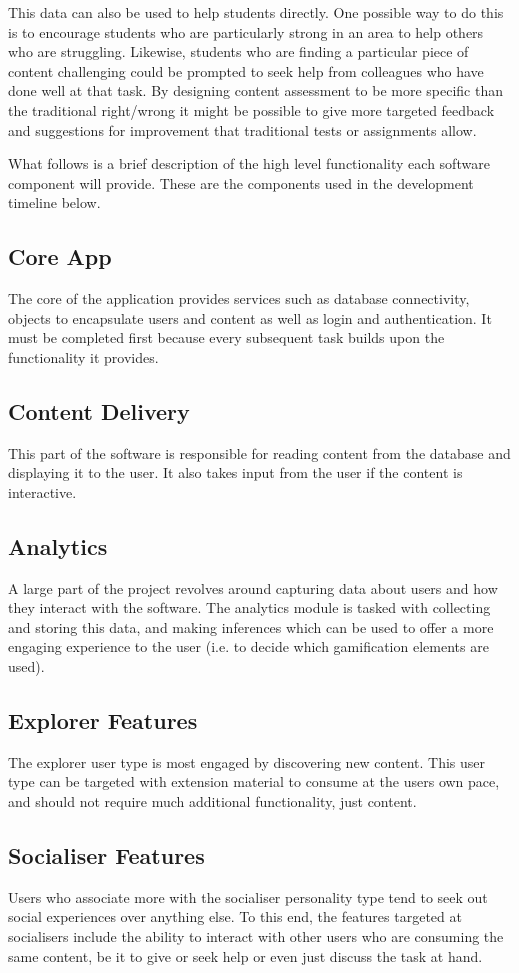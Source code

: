 \documentclass{report}
\begin{document}
This data can also be used to help students directly. One possible way to do this is to encourage students who are particularly strong in an area to help others who are struggling. Likewise, students who are finding a particular piece of content challenging could be prompted to seek help from colleagues who have done well at that task. By designing content assessment to be more specific than the traditional right/wrong it might be possible to give more targeted feedback and suggestions for improvement that traditional tests or assignments allow.

What follows is a brief description of the high level functionality each software component will provide. These are the components used in the development timeline below.

\subsection*{Core App}
The core of the application provides services such as database connectivity, objects to encapsulate users and content as well as login and authentication. It must be completed first because every subsequent task builds upon the functionality it provides.
\subsection*{Content Delivery}
This part of the software is responsible for reading content from the database and displaying it to the user. It also takes input from the user if the content is interactive.
\subsection*{Analytics}
A large part of the project revolves around capturing data about users and how they interact with the software. The analytics module is tasked with collecting and storing this data, and making inferences which can be used to offer a more engaging experience to the user (i.e. to decide which gamification elements are used).
\subsection*{Explorer Features}
The explorer user type is most engaged by discovering new content. This user type can be targeted with extension material to consume at the users own pace, and should not require much additional functionality, just content.
\subsection*{Socialiser Features}
Users who associate more with the socialiser personality type tend to seek out social experiences over anything else. To this end, the features targeted at socialisers include the ability to interact with other users who are consuming the same content, be it to give or seek help or even just discuss the task at hand.
\end{document}
